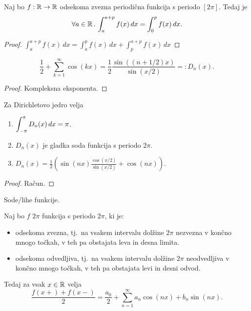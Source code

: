 \begin{lema}
    Naj bo \(f: \mathbb{R} \to \mathbb{R}\) odsekoma zvezna periodična funkcija s periodo \([2\pi]\). Tedaj je 
    \[
         \forall a \in \mathbb{R} \,.\, \int_{a}^{a+p} f(x) \, dx = \int_{0}^{p}  f(x) \, dx.
    \]
\end{lema}

\begin{proof}
    \(\int_{a}^{a+p} f(x) \, dx = \int_{a}^{p} f(x) \, dx + \int_{p}^{a+p} f(x) \, dx\)
\end{proof}

\begin{lema}
    \[\frac{1}{2} + \sum_{k=1}^{\infty} \cos(kx) = \frac{1}{2} \frac{\sin((n+1/2)x)}{\sin(x/2)} =: D_n(x).\]
\end{lema}

\begin{proof}
    Kompleksna eksponenta.
\end{proof}

\begin{lema}
    Za Dirichletovo jedro velja
    \begin{enumerate}
        \item \(\displaystyle \int_{-\pi}^{\pi} D_n(x) \, dx = \pi\).
        \item \(D_n(x)\) je gladka soda funkcija s periodo \(2\pi\).
        \item \(D_n(x) = \frac{1}{2} \left(\sin(nx)\frac{\cos(x/2)}{\sin(x/2)}  + \cos(nx)\right)\).
    \end{enumerate}
\end{lema}

\begin{proof}
    Račun.
\end{proof}

\begin{opomba}
    Sode/lihe funkcije. \todo{}
\end{opomba}

\begin{izrek}
    Naj bo \(f\) \(2\pi\) funkcija s periodo \(2\pi\), ki je:
    \begin{itemize}
        \item odsekoma zvezna, tj.\ na vsakem intervalu dolžine \(2\pi\) nezvezna v končno mnogo točkah, v teh pa obstajata leva in desna limita.
        \item odsekoma odvedljiva, tj.\ na vsakem intervalu dolžine \(2\pi\) neodvedljiva v končno mnogo točkah, v teh pa obstajata levi in desni odvod.
    \end{itemize}
    Tedaj za vsak \(x \in \mathbb{R}\) velja 
    \[
        \frac{f(x+) + f(x-)}{2} = \frac{a_0}{2} + \sum_{n=1}^{\infty} a_n \cos(nx) + b_n \sin(nx).
    \]
\end{izrek}

